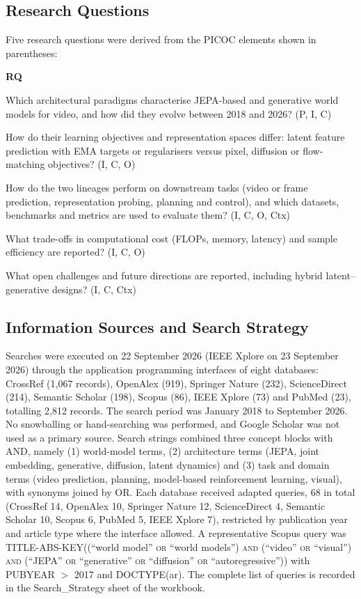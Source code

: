 \documentclass[conference,a4paper]{IEEEtran}
\newcounter{rqctr}
\newenvironment{rqlist}{%
  \begin{list}{\textbf{RQ\arabic{rqctr}}}{\usecounter{rqctr}%
    \setlength{\leftmargin}{2.5em}\setlength{\labelwidth}{2.2em}\setlength{\labelsep}{0.3em}%
    \setlength{\itemsep}{1pt}\setlength{\topsep}{2pt}\setlength{\parsep}{0pt}\setlength{\parskip}{0pt}}}%
  {\end{list}}
\begin{document}
\subsection{Research Questions}\label{sec:rq}
Five research questions were derived from the PICOC elements shown in parentheses:
\begin{rqlist}
\item Which architectural paradigms characterise JEPA-based and generative world models for video, and how did they evolve between 2018 and 2026? (P, I, C)
\item How do their learning objectives and representation spaces differ: latent feature prediction with EMA targets or regularisers versus pixel, diffusion or flow-matching objectives? (I, C, O)
\item How do the two lineages perform on downstream tasks (video or frame prediction, representation probing, planning and control), and which datasets, benchmarks and metrics are used to evaluate them? (I, C, O, Ctx)
\item What trade-offs in computational cost (FLOPs, memory, latency) and sample efficiency are reported? (I, C, O)
\item What open challenges and future directions are reported, including hybrid latent--generative designs? (I, C, Ctx)
\end{rqlist}

\subsection{Information Sources and Search Strategy}
Searches were executed on 22 September 2026 (IEEE Xplore on 23 September 2026) through the application programming interfaces of eight databases: CrossRef (1,067 records), OpenAlex (919), Springer Nature (232), ScienceDirect (214), Semantic Scholar (198), Scopus (86), IEEE Xplore (73) and PubMed (23), totalling 2,812 records. The search period was January 2018 to September 2026. No snowballing or hand-searching was performed, and Google Scholar was not used as a primary source. Search strings combined three concept blocks with AND, namely (1) world-model terms, (2) architecture terms (JEPA, joint embedding, generative, diffusion, latent dynamics) and (3) task and domain terms (video prediction, planning, model-based reinforcement learning, visual), with synonyms joined by OR. Each database received adapted queries, 68 in total (CrossRef 14, OpenAlex 10, Springer Nature 12, ScienceDirect 4, Semantic Scholar 10, Scopus 6, PubMed 5, IEEE Xplore 7), restricted by publication year and article type where the interface allowed. A representative Scopus query was TITLE-ABS-KEY((``world model'' \textsc{or} ``world models'') \textsc{and} (``video'' \textsc{or} ``visual'') \textsc{and} (``JEPA'' \textsc{or} ``generative'' \textsc{or} ``diffusion'' \textsc{or} ``autoregressive'')) with PUBYEAR $>$ 2017 and DOCTYPE(ar). The complete list of queries is recorded in the Search\_Strategy sheet of the workbook.
\end{document}
